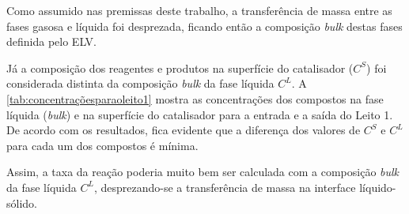 Como assumido nas premissas deste trabalho, a transferência de massa entre as
fases gasosa e líquida foi desprezada, ficando então a composição \emph{bulk}
destas fases definida pelo ELV.

Já a composição dos reagentes e produtos na superfície do catalisador ($C^S$)
foi considerada distinta da composição \emph{bulk} da fase líquida $C^L$. A
\autoref{tab:concentraçõesparaoleito1} mostra as concentrações dos compostos na
fase líquida (\emph{bulk}) e na superfície do catalisador para a entrada e a
saída do Leito 1. De acordo com os resultados, fica evidente que a diferença dos
valores de $C^S$ e $C^L$ para cada um dos compostos é mínima.

Assim, a taxa da reação poderia muito bem ser calculada com a composição
\emph{bulk} da fase líquida $C^L$, desprezando-se a transferência de massa na
interface líquido-sólido.

